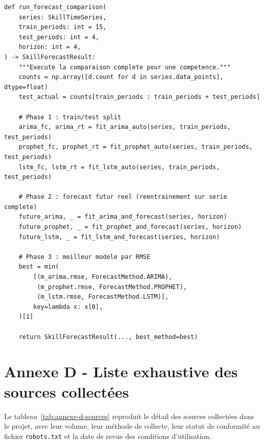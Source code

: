 \documentclass[11pt,a4paper,openany]{report}
\begin{document}
\begin{lstlisting}[caption={Extrait de \texttt{skillnav/pipelines/usage\_mining/comparison.py}}]
def run_forecast_comparison(
    series: SkillTimeSeries,
    train_periods: int = 15,
    test_periods: int = 4,
    horizon: int = 4,
) -> SkillForecastResult:
    """Execute la comparaison complete pour une competence."""
    counts = np.array([d.count for d in series.data_points], dtype=float)
    test_actual = counts[train_periods : train_periods + test_periods]

    # Phase 1 : train/test split
    arima_fc, arima_rt = fit_arima_auto(series, train_periods, test_periods)
    prophet_fc, prophet_rt = fit_prophet_auto(series, train_periods, test_periods)
    lstm_fc, lstm_rt = fit_lstm_auto(series, train_periods, test_periods)

    # Phase 2 : forecast futur reel (reentrainement sur serie complete)
    future_arima, _ = fit_arima_and_forecast(series, horizon)
    future_prophet, _ = fit_prophet_and_forecast(series, horizon)
    future_lstm, _ = fit_lstm_and_forecast(series, horizon)

    # Phase 3 : meilleur modele par RMSE
    best = min(
        [(m_arima.rmse, ForecastMethod.ARIMA),
         (m_prophet.rmse, ForecastMethod.PROPHET),
         (m_lstm.rmse, ForecastMethod.LSTM)],
        key=lambda x: x[0],
    )[1]

    return SkillForecastResult(..., best_method=best)
\end{lstlisting}

\section*{Annexe D - Liste exhaustive des sources collect\'ees}

Le tableau~\ref{tab:annexe-d-sources} reproduit le d\'etail des sources collect\'ees dans le projet, avec leur volume, leur m\'ethode de collecte, leur statut de conformit\'e au fichier \texttt{robots.txt} et la date de revue des conditions d'utilisation.
\end{document}
